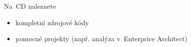 
\listofappendices

Na~CD naleznete
\begin{itemize}
	\item {kompletní zdrojové kódy}
	\item {pomocné projekty (např. analýza v~Enterprice Architect)}
\end{itemize}


